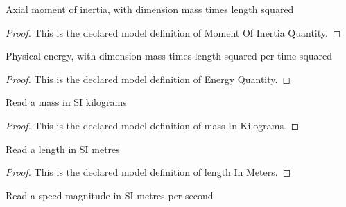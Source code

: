 \begin{definition}
  \label{def:physics:phyx-mini-0770:phyxminiproblems-problemphyxmini0770-momentofinertiaquantity}
  Axial moment of inertia, with dimension mass times length squared
\end{definition}
\begin{proof}
  This is the declared model definition of Moment Of Inertia Quantity.
\end{proof}
\begin{definition}
  \label{def:physics:phyx-mini-0770:phyxminiproblems-problemphyxmini0770-energyquantity}
  Physical energy, with dimension mass times length squared per time squared
\end{definition}
\begin{proof}
  This is the declared model definition of Energy Quantity.
\end{proof}
\begin{definition}
  \label{def:physics:phyx-mini-0770:phyxminiproblems-problemphyxmini0770-massinkilograms}
  Read a mass in SI kilograms
\end{definition}
\begin{proof}
  This is the declared model definition of mass In Kilograms.
\end{proof}
\begin{definition}
  \label{def:physics:phyx-mini-0770:phyxminiproblems-problemphyxmini0770-lengthinmeters}
  Read a length in SI metres
\end{definition}
\begin{proof}
  This is the declared model definition of length In Meters.
\end{proof}
\begin{definition}
  \label{def:physics:phyx-mini-0770:phyxminiproblems-problemphyxmini0770-speedinmeterspersecond}
  Read a speed magnitude in SI metres per second
\end{definition}
